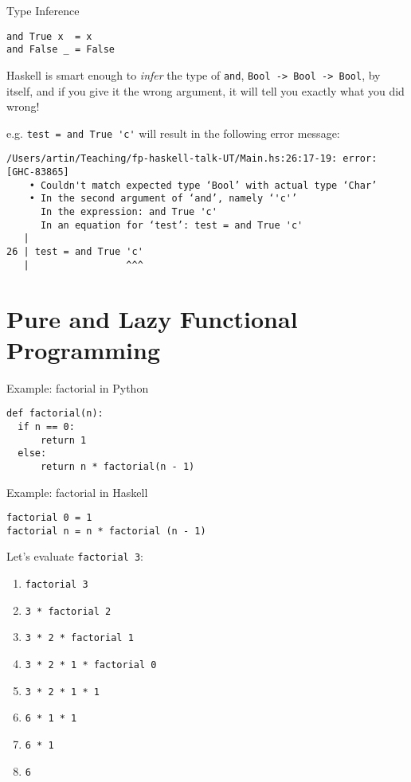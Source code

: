 \documentclass[pdf]{beamer}
\begin{document}
\begin{frame}[fragile]{Type Inference}
\begin{verbatim}
and True x  = x
and False _ = False
\end{verbatim}

  Haskell is smart enough to \textit{infer} the type of \verb|and|, \verb|Bool -> Bool -> Bool|, by itself, and if you give it the wrong argument, it will tell you exactly what you did wrong!

  e.g. \verb|test = and True 'c'| will result in the following error message:

\begin{verbatim}
/Users/artin/Teaching/fp-haskell-talk-UT/Main.hs:26:17-19: error: [GHC-83865]
    • Couldn't match expected type ‘Bool’ with actual type ‘Char’
    • In the second argument of ‘and’, namely ‘'c'’
      In the expression: and True 'c'
      In an equation for ‘test’: test = and True 'c'
   |
26 | test = and True 'c'
   |                 ^^^
\end{verbatim}

\end{frame}

\section{Pure and Lazy Functional Programming}
\label{sec:pure-lazy-fp}

\begin{frame}[fragile]{Example: factorial in Python}
\begin{verbatim}
def factorial(n):
  if n == 0:
      return 1
  else:
      return n * factorial(n - 1)
\end{verbatim}
\end{frame}

\begin{frame}[fragile]{Example: factorial in Haskell}

\begin{verbatim}
factorial 0 = 1
factorial n = n * factorial (n - 1)
\end{verbatim}

  \pause
  Let's evaluate \verb|factorial 3|:

  \begin{enumerate}
    \item<1-> \verb|factorial 3|
    \item<2-> \verb|3 * factorial 2|
    \item<3-> \verb|3 * 2 * factorial 1|
    \item<4-> \verb|3 * 2 * 1 * factorial 0|
    \item<5-> \verb|3 * 2 * 1 * 1|
    \item<6-> \verb|6 * 1 * 1|
    \item<7-> \verb|6 * 1|
    \item<8-> \verb|6|
  \end{enumerate}

\end{frame}
\end{document}

